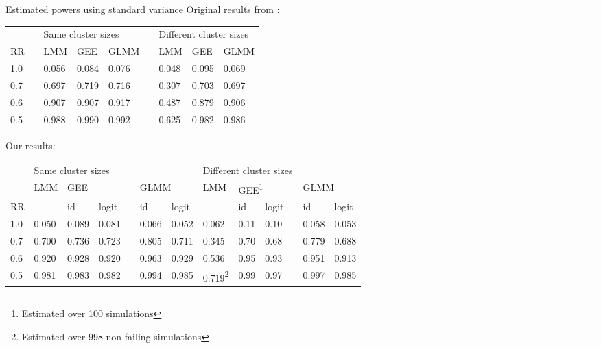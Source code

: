 \documentclass[9pt]{beamer}
\begin{document}
\begin{frame}{Estimated powers using standard variance}
Original results from \citet{Hussey:2007}:
\begin{table}[h]
\small
\centering
\begin{tabular}{@{}lclllclll@{}}
\toprule
&& \multicolumn{3}{l}{Same cluster sizes} && \multicolumn{3}{l}{Different cluster sizes} \\
\cmidrule{3-5}\cmidrule{7-9}
RR & & LMM & GEE & GLMM && LMM & GEE & GLMM \\
\midrule
1.0 &&  0.056 & 0.084 & 0.076 && 0.048 & 0.095 & 0.069 \\
0.7 && 0.697 & 0.719 & {\color{blue}0.716} && 0.307 & 0.703 & {\color{blue}0.697} \\
0.6 && 0.907 & 0.907 & 0.917 && 0.487 & 0.879 & 0.906 \\
0.5 && 0.988 & 0.990 & 0.992 && {\color{purple}0.625} & 0.982 & 0.986 \\
\bottomrule
\end{tabular}
\end{table}
Our results:
\begin{table}[h]
\small
\centering
\begin{tabular}{@{}llllcll|lllcll@{}}
\toprule
 & \multicolumn{6}{l|}{Same cluster sizes} & \multicolumn{6}{l}{Different cluster sizes} \\
\cmidrule{2-7}\cmidrule{8-13}
& LMM & \multicolumn{2}{l}{GEE} && \multicolumn{2}{l|}{GLMM} & LMM & \multicolumn{2}{l}{GEE\footnote{Estimated over 100 simulations}} && \multicolumn{2}{l}{GLMM} \\
\cmidrule{3-4}\cmidrule{6-7}\cmidrule{9-10}\cmidrule{12-13}
 RR & & id & logit && id & logit & & id & logit && id & logit \\
\midrule
1.0 &  0.050 & 0.089 & 0.081 && 0.066 & 0.052 & 0.062 & 0.11 & 0.10 && 0.058 & 0.053 \\
0.7 & 0.700 & 0.736 & 0.723 && {\color{blue}0.805} & {\color{blue}0.711} & 0.345 & 0.70 & 0.68 && {\color{blue}0.779} & {\color{blue}0.688} \\
0.6 & 0.920 & 0.928 & 0.920 && 0.963 & 0.929 & 0.536 & 0.95 & 0.93 && 0.951 & 0.913 \\
0.5 & 0.981 & 0.983 & 0.982 && 0.994 & 0.985 & {\color{purple}0.719}\footnote{Estimated over 998 non-failing simulations} & 0.99 & 0.97 && 0.997 & 0.985 \\
\bottomrule
\end{tabular}
\end{table}
\end{frame}
\end{document}
